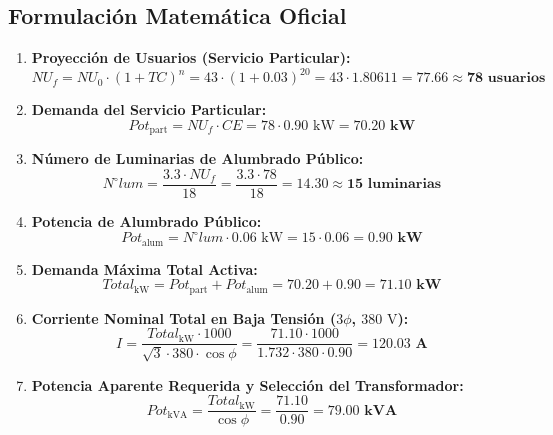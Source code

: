 \documentclass[12pt,a4paper]{report}
\begin{document}
\subsection{Formulación Matemática Oficial}
\begin{enumerate}
    \item \textbf{Proyección de Usuarios (Servicio Particular):}
    \begin{equation}
        NU_f = NU_0 \cdot (1 + TC)^n = 43 \cdot (1 + 0.03)^{20} = 43 \cdot 1.80611 = 77.66 \approx \mathbf{78\text{ usuarios}}
    \end{equation}
    \item \textbf{Demanda del Servicio Particular:}
    \begin{equation}
        Pot_{\text{part}} = NU_f \cdot CE = 78 \cdot 0.90\text{ kW} = \mathbf{70.20\text{ kW}}
    \end{equation}
    \item \textbf{Número de Luminarias de Alumbrado Público:}
    \begin{equation}
        N^\circ lum = \frac{3.3 \cdot NU_f}{18} = \frac{3.3 \cdot 78}{18} = 14.30 \approx \mathbf{15\text{ luminarias}}
    \end{equation}
    \item \textbf{Potencia de Alumbrado Público:}
    \begin{equation}
        Pot_{\text{alum}} = N^\circ lum \cdot 0.06\text{ kW} = 15 \cdot 0.06 = \mathbf{0.90\text{ kW}}
    \end{equation}
    \item \textbf{Demanda Máxima Total Activa:}
    \begin{equation}
        Total_{\text{kW}} = Pot_{\text{part}} + Pot_{\text{alum}} = 70.20 + 0.90 = \mathbf{71.10\text{ kW}}
    \end{equation}
    \item \textbf{Corriente Nominal Total en Baja Tensión ($3\phi$, $380\text{ V}$):}
    \begin{equation}
        I = \frac{Total_{\text{kW}} \cdot 1000}{\sqrt{3} \cdot 380 \cdot \cos\phi} = \frac{71.10 \cdot 1000}{1.732 \cdot 380 \cdot 0.90} = \mathbf{120.03\text{ A}}
    \end{equation}
    \item \textbf{Potencia Aparente Requerida y Selección del Transformador:}
    \begin{equation}
        Pot_{\text{kVA}} = \frac{Total_{\text{kW}}}{\cos\phi} = \frac{71.10}{0.90} = \mathbf{79.00\text{ kVA}}
    \end{equation}
\end{enumerate}
\end{document}

